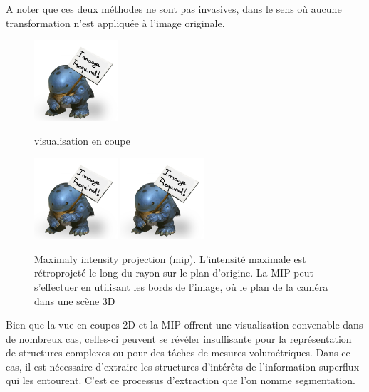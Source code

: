 A noter que ces deux méthodes ne sont pas invasives, dans le sens où aucune transformation n'est appliquée à l'image originale.

\begin{figure}
  \centering
  \includegraphics[height=3cm]{Images/img_required.jpg}
  \label{fig:visualisation en coupe}
  \caption{visualisation en coupe}
\end{figure}

\begin{figure}
  \centering
  \includegraphics[height=3cm]{Images/img_required.jpg}
  \includegraphics[height=3cm]{Images/img_required.jpg}
  \label{fig:visualisation MIP}
  \caption{Maximaly intensity projection (mip). L'intensité maximale est rétroprojeté le long du rayon sur le plan d'origine. La MIP peut s'effectuer en utilisant les bords de l'image, où le plan de la caméra dans une scène 3D}
\end{figure}

Bien que la vue en coupes 2D et la MIP offrent une visualisation convenable dans de nombreux cas, celles-ci peuvent se révéler insuffisante pour la représentation de structures complexes ou pour des tâches de mesures volumétriques. Dans ce cas, il est nécessaire d'extraire les structures d'intérêts de l'information superflux qui les entourent. C'est ce processus d'extraction que l'on nomme segmentation.  


